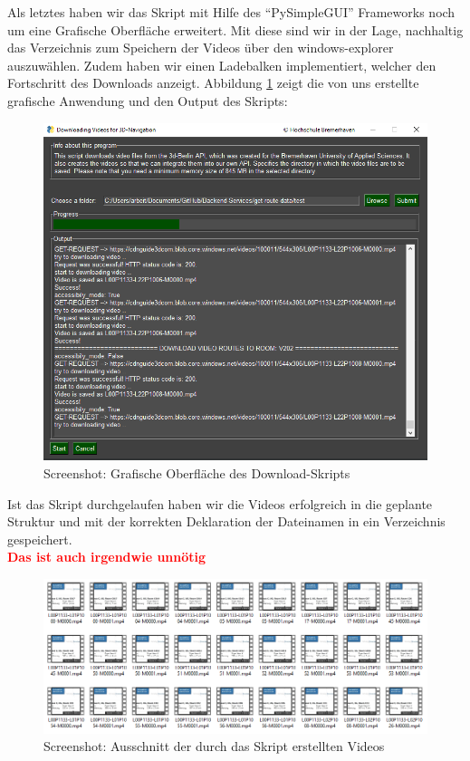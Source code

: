 Als letztes haben wir das Skript mit Hilfe des ``PySimpleGUI''  Frameworks noch um eine Grafische Oberfläche erweitert. Mit diese sind wir in der Lage, nachhaltig das Verzeichnis zum Speichern der Videos über den windows-explorer auszuwählen. Zudem haben wir einen Ladebalken implementiert, welcher den Fortschritt des Downloads anzeigt. Abbildung \ref{fig:gui-route} zeigt die von uns erstellte grafische Anwendung und den Output des Skripts:

\begin{figure}[H]
    \includegraphics[width=\textwidth]{Figures/3DNavigator/create_videodata_pic.png}
    \caption{Screenshot: Grafische Oberfläche des Download-Skripts}
    \label{fig:gui-route}
    \centering
\end{figure}\vspace{-2.5mm}

Ist das Skript durchgelaufen haben wir die Videos erfolgreich in die geplante Struktur und mit der korrekten Deklaration der Dateinamen in ein Verzeichnis gespeichert.\\

\textcolor{red}{\textbf{Das ist auch irgendwie unnötig}}
\begin{figure}[H]
    \includegraphics[width=\textwidth]{Figures/3DNavigator/videos.png}
    \caption{Screenshot: Ausschnitt der durch das Skript erstellten Videos}
    \label{fig:integration}
    \centering
\end{figure}\vspace{-2.5mm}

